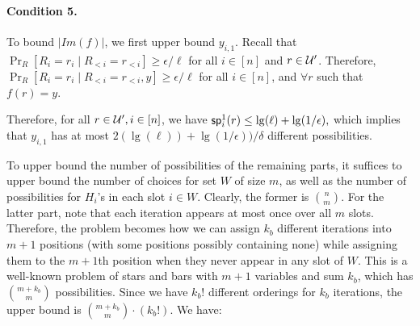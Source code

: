 \paragraph{Condition 5.}
To bound $|Im(f)|$, we first upper bound $y_{i,1}$.
Recall that $\Pr_{R}[R_i = r_i \mid R_{<i} = r_{<i}] \geq \epsilon/\ell$ for all $i \in [n]$ and $r \in \mathcal{U}'$. Therefore,  $\Pr_{R}[R_i = r_i \mid R_{<i} = r_{<i}, y] \geq \epsilon/\ell$ for all $i \in [n]$, and $\forall r$ such that $f(r) = y$.

Therefore, for all $r\in \mathcal{U}', i \in [n]$, we have 
$\mathsf{sp}^1_i(r) \le \lg (\ell) + \lg (1/\epsilon),$
which implies that 
$y_{i,1}$ has at most $2(\lg(\ell)) + \lg (1/\epsilon))/\delta$ different possibilities. 

To upper bound the number of possibilities of the remaining parts, it suffices to upper bound the number of choices for set $W$ of size $m$, as well as the number of possibilities for $H_i$'s in each slot $i \in W$. Clearly, the former is $\binom{n}{m}$. For the latter part, note that each iteration appears at most once over all $m$ slots. Therefore, the problem becomes how we can assign $k_b$ different iterations into $m+1$ positions (with some positions possibly containing none) while assigning them to the $m+1$th position when they never appear in any slot of $W$. This is a well-known problem of stars and bars with $m+1$ variables and sum $k_b$, which has $\binom{m+k_b}{m}$ possibilities. Since we have $k_b!$ different orderings for $k_b$ iterations, the upper bound is $\binom{m+k_b}{m} \cdot (k_b!)$.
We have:












%

